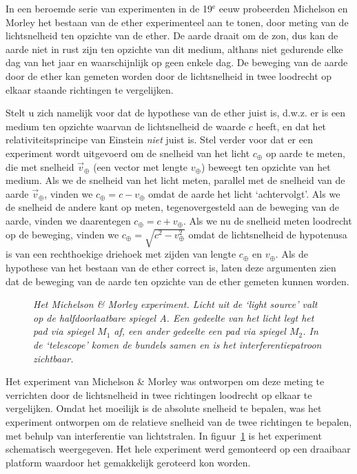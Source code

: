 In een beroemde serie van experimenten in de 19$^{\mathrm{e}}$ eeuw probeerden
Michelson en Morley het bestaan van de ether experimenteel aan te
tonen, door meting van de lichtsnelheid ten opzichte van de ether. De
aarde draait om de zon, dus kan de aarde niet in rust zijn ten
opzichte van dit medium, althans niet gedurende elke dag van het jaar
en waarschijnlijk op geen enkele dag. De beweging van de aarde door de
ether kan gemeten worden door de lichtsnelheid in twee loodrecht op elkaar staande richtingen te vergelijken. 

Stelt u zich namelijk voor dat de hypothese van de ether juist is, d.w.z. er is
een medium ten opzichte waarvan de lichtsnelheid de waarde $c$ heeft,
en dat het relativiteitsprincipe van Einstein {\it niet} juist is. Stel
verder voor dat er een experiment wordt uitgevoerd om de snelheid van
het licht $c_{\oplus}$ op aarde te meten, die met snelheid
$\vec{v}_{\oplus}$ (een vector met lengte $v_{\oplus}$) beweegt ten
opzichte van het medium. Als we de snelheid van het licht meten,
parallel met de snelheid van de aarde $\vec{v}_{\oplus}$, vinden we
$c_{\oplus}=c-v_{\oplus}$ omdat de aarde het licht `achtervolgt'. Als
we de snelheid de andere kant op meten, tegenovergesteld aan de
beweging van de aarde, vinden we daarentegen
$c_{\oplus}=c+v_{\oplus}$. Als we nu de snelheid meten loodrecht op de
beweging, vinden we $c_{\oplus}=\sqrt{c^2-v^2_{\oplus}}$ omdat de
lichtsnelheid de hypotenusa is van een rechthoekige driehoek met
zijden van lengte $c_{\oplus}$ en $v_{\oplus}$. Als de hypothese van het bestaan van de ether correct is, laten deze argumenten zien dat de beweging van de aarde
ten opzichte van de ether gemeten kunnen worden.

\begin{figure}[ht]
\centering
{}
\caption{{\sl Het Michelson \& Morley experiment. Licht uit de `light
source' valt op de halfdoorlaatbare spiegel A. Een gedeelte van het
licht legt het pad via spiegel $M_1$ af, een ander gedeelte een pad
via spiegel $M_2$. In de `telescope' komen de bundels samen en is het interferentiepatroon
zichtbaar.}}
\label{f:mm}
\end{figure}


Het experiment van Michelson \& Morley was ontworpen om deze meting te
verrichten door de lichtsnelheid in twee richtingen loodrecht op elkaar te vergelijken. Omdat het moeilijk is de absolute snelheid te
bepalen, was het experiment ontworpen om de relatieve snelheid van de
twee richtingen te bepalen, met behulp van interferentie van
lichtstralen. In figuur~\ref{f:mm} is het experiment schematisch
weergegeven. Het hele experiment werd gemonteerd op een draaibaar
platform waardoor het gemakkelijk geroteerd kon worden.

